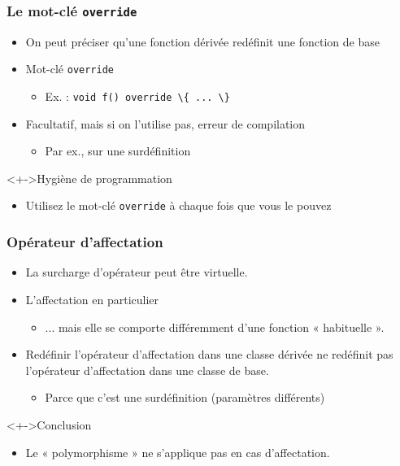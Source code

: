 \begin{frame}
\frametitle{Le mot-clé \texttt{override}}
\begin{itemize}[<+->]
\item On peut préciser qu'une fonction dérivée redéfinit une fonction de base
\item Mot-clé \lstinline|override|
	\begin{itemize}
	\item Ex. : \lstinline|void f() override \{ ... \}|
	\end{itemize}
\item Facultatif, mais si on l'utilise pas, erreur de compilation
	\begin{itemize}
	\item Par ex., sur une surdéfinition
	\end{itemize}
\end{itemize}
\begin{exampleblock}<+->{Hygiène de programmation}
	\begin{itemize}[<+->]
	\item Utilisez le mot-clé \lstinline|override| à chaque fois que vous le pouvez
	\end{itemize}
\end{exampleblock}
\end{frame}

\begin{frame}
\frametitle{Opérateur d'affectation}
\begin{itemize}[<+->]
\item La surcharge d'opérateur peut être virtuelle.
\item L'affectation en particulier
	\begin{itemize}
	\item ... mais elle se comporte différemment d'une fonction « habituelle ».
	\end{itemize}
\item Redéfinir l'opérateur d'affectation dans une classe dérivée ne redéfinit pas l'opérateur d'affectation dans une classe de base.
	\begin{itemize}
	\item Parce que c'est une surdéfinition (paramètres différents)
	\end{itemize}
\end{itemize}
\begin{alertblock}<+->{Conclusion}
	\begin{itemize}[<+->]
	\item Le « polymorphisme » ne s'applique pas en cas d'affectation.
	\end{itemize}
\end{alertblock}
\end{frame}

